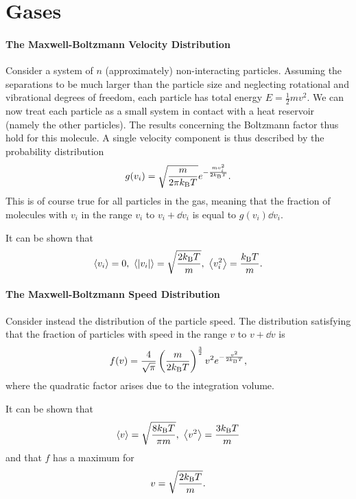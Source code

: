 \section{Gases}

\paragraph{The Maxwell-Boltzmann Velocity Distribution}
Consider a system of $n$ (approximately) non-interacting particles. Assuming the separations to be much larger than the particle size and neglecting rotational and vibrational degrees of freedom, each particle has total energy $E = \frac{1}{2}mv^{2}$. We can now treat each particle as a small system in contact with a heat reservoir (namely the other particles). The results concerning the Boltzmann factor thus hold for this molecule. A single velocity component is thus described by the probability distribution
\begin{align*}
	g(v_{i}) = \sqrt{\frac{m}{2\pi k_{\text{B}} T}}e^{-\frac{mv_{i}^{2}}{2k_{\text{B}} T}}.
\end{align*}
This is of course true for all particles in the gas, meaning that the fraction of molecules with $v_{i}$ in the range $v_{i}$ to $v_{i} + \dd{v_{i}}$ is equal to $g(v_{i})\dd{v_{i}}$.

It can be shown that
\begin{align*}
	\expval{v_{i}} = 0,\ \expval{\abs{v_{i}}} = \sqrt{\frac{2k_{\text{B}} T}{m}},\ \expval{v_{i}^{2}} = \frac{k_{\text{B}} T}{m}.
\end{align*}

\paragraph{The Maxwell-Boltzmann Speed Distribution}
Consider instead the distribution of the particle speed. The distribution satisfying that the fraction of particles with speed in the range $v$ to $v + \dd{v}$ is
\begin{align*}
	f(v) = \frac{4}{\sqrt{\pi}}\left(\frac{m}{2k_{\text{B}} T}\right)^{\frac{3}{2}}v^{2}e^{-\frac{v^{2}}{2k_{\text{B}} T}},
\end{align*}
where the quadratic factor arises due to the integration volume.

It can be shown that
\begin{align*}
	\expval{v} = \sqrt{\frac{8k_{\text{B}} T}{\pi m}},\ \expval{v^{2}} = \frac{3k_{\text{B}} T}{m}
\end{align*}
and that $f$ has a maximum for
\begin{align*}
	v = \sqrt{\frac{2k_{\text{B}} T}{m}}.
\end{align*}

